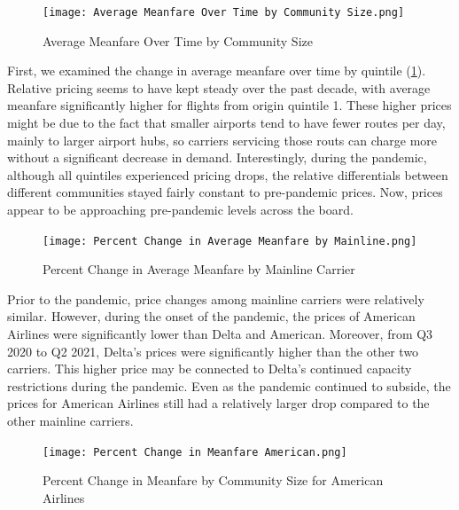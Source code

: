 \documentclass[11pt]{article}
\begin{document}
\begin{figure}[htbp!]
\centerline{\texttt{[image: Average Meanfare Over Time by Community Size.png]}}
  \label{Average Meanfare Over Time by Community Size}
    \caption{Average Meanfare Over Time by Community Size}
\end{figure}
First, we examined the change in average meanfare over time by quintile (\cref{Average Meanfare Over Time by Community Size}). Relative pricing seems to have kept steady over the past decade, with average meanfare significantly higher for flights from origin quintile 1. These higher prices might be due to the fact that smaller airports tend to have fewer routes per day, mainly to larger airport hubs, so carriers servicing those routs can charge more without a significant decrease  in demand. Interestingly, during the pandemic, although all quintiles experienced pricing drops, the relative differentials between different communities stayed fairly constant to pre-pandemic prices. Now, prices appear to be approaching pre-pandemic levels across the board.

\begin{figure}[htbp!]
\centerline{\texttt{[image: Percent Change in Average Meanfare by Mainline.png]}}
  \label{Percent Change in Average Meanfare by Mainline}
    \caption{Percent Change in Average Meanfare by Mainline Carrier}
\end{figure}
\-\hspace{0.5cm} Prior to the pandemic, price changes among mainline carriers were relatively similar. However, during the onset of the pandemic, the prices of American Airlines were significantly lower than Delta and American. Moreover, from Q3 2020 to Q2 2021, Delta’s prices were significantly higher than the other two carriers. This higher price may be connected to Delta’s continued capacity restrictions during the pandemic. Even as the pandemic continued to subside, the prices for American Airlines still had a relatively larger drop compared to the other mainline carriers.

\begin{figure}[htbp!]
\centerline{\texttt{[image: Percent Change in Meanfare American.png]}}
  \label{Percent Change in Meanfare American}
    \caption{Percent Change in Meanfare by Community Size for American Airlines}
\end{figure}
\end{document}
